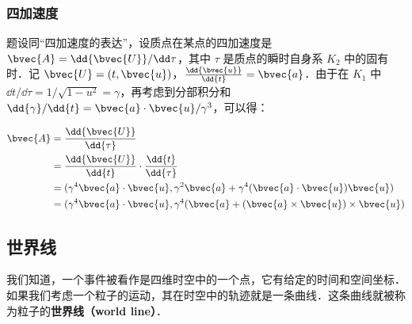 \subsubsection{四加速度}

题设同“四加速度的表达”，设质点在某点的四加速度是 $\bvec{A}=\dd{\bvec{U}}/\dd\tau$，其中 $\tau$ 是质点的瞬时自身系 $K_2$ 中的固有时．记 $\bvec{U}=(t, \bvec{u})$，$\frac{\dd{\bvec{u}}}{\dd{t}}=\bvec{a}$．由于在 $K_1$ 中 $\dd{t}/\dd{\tau}=1/\sqrt{1-u^2}=\gamma$，再考虑到分部积分和 $\dd{\gamma}/\dd{t}=\bvec{a}\cdot\bvec{u}/\gamma^3$，可以得：

\begin{equation}
\begin{aligned}
%
\bvec{A}&=\frac{\dd{\bvec{U}}}{\dd{\tau}}\\&=\frac{\dd{\bvec{U}}}{\dd{t}}\cdot\frac{\dd{t}}{\dd{\tau}}\\&=(\gamma^4\bvec{a}\cdot\bvec{u}, \gamma^2\bvec{a}+\gamma^4(\bvec{a}\cdot\bvec{u})\bvec{u})\\&=(\gamma^4\bvec{a}\cdot\bvec{u}, \gamma^4(\bvec{a}+(\bvec{a}\times\bvec{u})\times\bvec{u})
%
\end{aligned}
\end{equation}

\subsection{世界线}

我们知道，一个事件被看作是四维时空中的一个点，它有给定的时间和空间坐标．如果我们考虑一个粒子的运动，其在时空中的轨迹就是一条曲线．这条曲线就被称为粒子的\textbf{世界线（world line）}．


